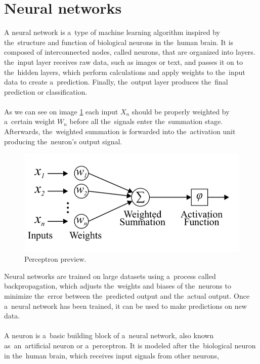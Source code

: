 \section{Neural networks} \label{sec:nn}
A neural network is a~type of machine learning algorithm inspired by the~structure and function of biological neurons
in the~human brain. It is composed of interconnected nodes, called neurons, that are organized into layers. the~input
layer receives raw data, such as images or text, and passes it on to the~hidden layers, which perform calculations and
apply weights to the~input data to create a~prediction. Finally, the~output layer produces the~final prediction
or classification.\\
\\
As we can see on image \ref{fig:perceptron} each input $X_n$ should be properly weighted by a~certain weight $W_n$ before
all the~signals enter the~summation stage. Afterwards, the~weighted summation is forwarded into the~activation unit
producing the~neuron’s output signal.
\begin{center}
    \begin{figure}[!ht]
        \centering
        \includegraphics[width=1\textwidth]{figures/nn}
        \caption{Perceptron preview. \cite{Mourgias-Alexandris:19}}
        \label{fig:perceptron}
    \end{figure}
\end{center}
Neural networks are trained on large datasets using a~process called backpropagation, which adjusts the~weights and
biases of the~neurons to minimize the~error between the~predicted output and the~actual output. Once a~neural network
has been trained, it can be used to make predictions on new data.\\
\\
A neuron is a~basic building block of a~neural network, also known as~an~artificial neuron or a~perceptron.
It is modeled after the~biological neuron in the~human brain, which receives input signals from other neurons,
